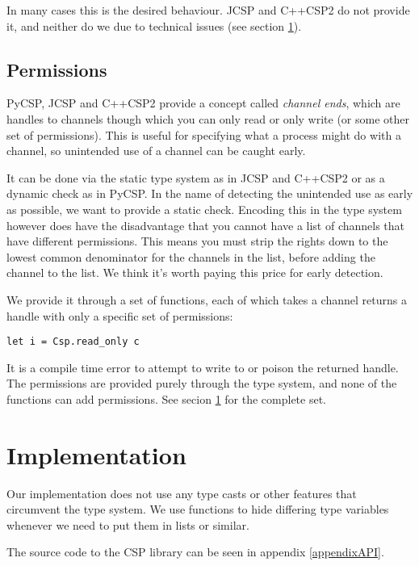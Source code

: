 \documentclass[a4paper,12pt]{article}
\begin{document}
In many cases this is the desired behaviour. JCSP and C++CSP2 do not provide it,
and neither do we due to technical issues (see section \ref{implementation}).

\subsection{Permissions}

PyCSP, JCSP and C++CSP2 provide a concept called \emph{channel ends}, which are
handles to channels though which you can only read or only write (or some other
set of permissions). This is useful for specifying what a process might do with
a channel, so unintended use of a channel can be caught early.

It can be done via the static type system as in JCSP and C++CSP2 or as a dynamic
check as in PyCSP. In the name of detecting the unintended use as early as
possible, we want to provide a static check. Encoding this in the type system
however does have the disadvantage that you cannot have a list of channels that
have different permissions. This means you must strip the rights down to the
lowest common denominator for the channels in the list, before adding the
channel to the list. We think it's worth paying this price for early detection.

We provide it through a set of functions, each of which takes a channel
returns a handle with only a specific set of permissions:

\begin{verbatim}
let i = Csp.read_only c
\end{verbatim}

It is a compile time error to attempt to write to or poison the returned handle.
The permissions are provided purely through the type system, and none of the
functions can add permissions. See secion \ref{implementation} for the complete
set.

\section{Implementation}
\label{implementation}

Our implementation does not use any type casts or other features that
circumvent the type system. We use functions to hide differing type variables
whenever we need to put them in lists or similar.

The source code to the CSP library can be seen in appendix \ref{appendixAPI}.
\end{document}
